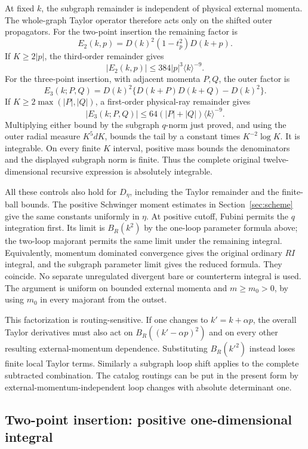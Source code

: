 At fixed $k$, the subgraph remainder is independent of physical external
momenta. The whole-graph Taylor operator therefore acts only on the shifted
outer propagators. For the two-point insertion the remaining factor is
\[
 E_2(k,p)=D(k)^2(1-t_p^2)D(k+p).
\]
If $K\ge2|p|$, the third-order remainder gives
\[
 |E_2(k,p)|\le384|p|^3\langle k\rangle^{-9}.
\]
For the three-point insertion, with adjacent momenta $P,Q$, the outer
factor is
\[
 E_3(k;P,Q)=D(k)^2\{D(k+P)D(k+Q)-D(k)^2\}.
\]
If $K\ge2\max(|P|,|Q|)$, a first-order physical-ray remainder gives
\[
 |E_3(k;P,Q)|\le64(|P|+|Q|)\langle k\rangle^{-9}.
\]
Multiplying either bound by the subgraph $q$-norm just proved, and using
the outer radial measure $K^5dK$, bounds the tail by a constant times
$K^{-2}\log K$. It is integrable. On every finite $K$ interval, positive
mass bounds the denominators and the displayed subgraph norm is finite.
Thus the complete original twelve-dimensional recursive expression is
absolutely integrable.

All these controls also hold for $D_\eta$, including the Taylor remainder
and the finite-ball bounds. The positive Schwinger moment estimates in
Section~\ref{sec:scheme} give the same constants uniformly in $\eta$.
At positive cutoff, Fubini permits the $q$ integration first. Its limit is
$B_R(k^2)$ by the one-loop parameter formula above; the two-loop majorant
permits the same limit under the remaining integral. Equivalently,
momentum dominated convergence gives the original ordinary $RI$ integral,
and the subgraph parameter limit gives the reduced formula. They coincide.
No separate unregulated divergent bare or counterterm integral is used.
The argument is uniform on bounded external momenta and $m\ge m_0>0$,
by using $m_0$ in every majorant from the outset.

This factorization is routing-sensitive. If one changes to
$k'=k+\alpha p$, the overall Taylor derivatives must also act on
$B_R((k'-\alpha p)^2)$ and on every other resulting external-momentum
dependence. Substituting $B_R(k'^2)$ instead loses finite local Taylor
terms. Similarly a subgraph loop shift applies to the complete subtracted
combination. The catalog routings can be put in the present form by
external-momentum-independent loop changes with absolute determinant one.

\subsection{Two-point insertion: positive one-dimensional integral}

